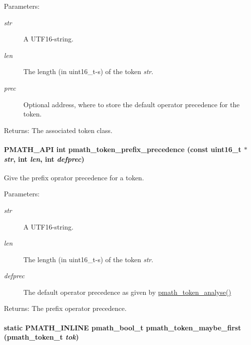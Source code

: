 \begin{Desc}
\item[Parameters:]
\begin{description}
\item[{\em str}]A UTF16-string. \item[{\em len}]The length (in uint16\_\-t-s) of the token {\em str\/}. \item[{\em prec}]Optional address, where to store the default operator precedence for the token. \end{description}
\end{Desc}
\begin{Desc}
\item[Returns:]The associated token class. \end{Desc}
\hypertarget{group__parser_g4e6cd1a92733aa00d32d48ac1e95aae2}{
\paragraph[{pmath\_\-token\_\-prefix\_\-precedence}]{\setlength{\rightskip}{0pt plus 5cm}PMATH\_\-API int pmath\_\-token\_\-prefix\_\-precedence (const uint16\_\-t $\ast$ {\em str}, \/  int {\em len}, \/  int {\em defprec})}\hfill}
\label{group__parser_g4e6cd1a92733aa00d32d48ac1e95aae2}


Give the prefix oprator precedence for a token. 

\begin{Desc}
\item[Parameters:]
\begin{description}
\item[{\em str}]A UTF16-string. \item[{\em len}]The length (in uint16\_\-t-s) of the token {\em str\/}. \item[{\em defprec}]The default operator precedence as given by \hyperlink{group__parser_g0cfde53ccdddc80d034dc5ee1ea54508}{pmath\_\-token\_\-analyse()} \end{description}
\end{Desc}
\begin{Desc}
\item[Returns:]The prefix operator precedence. \end{Desc}
\hypertarget{group__parser_gb35bd0bbe60489c1169902df67c3714b}{
\paragraph[{pmath\_\-token\_\-maybe\_\-first}]{\setlength{\rightskip}{0pt plus 5cm}static PMATH\_\-INLINE {\bf pmath\_\-bool\_\-t} pmath\_\-token\_\-maybe\_\-first ({\bf pmath\_\-token\_\-t} {\em tok})}\hfill}
\label{group__parser_gb35bd0bbe60489c1169902df67c3714b}


